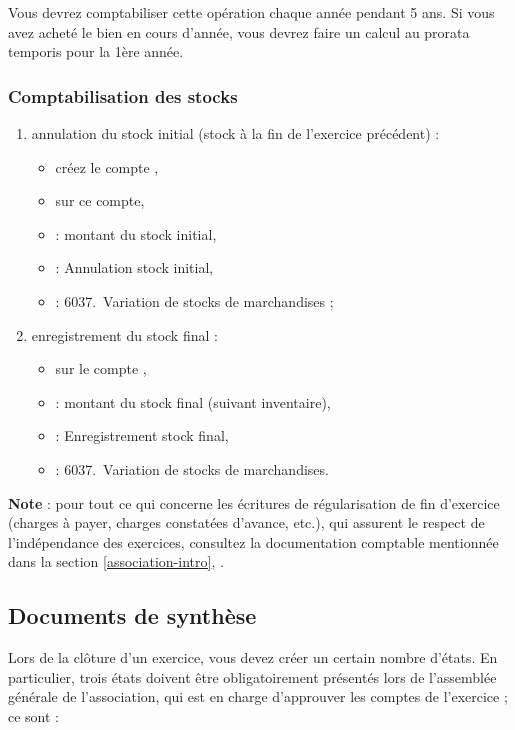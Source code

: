 Vous devrez comptabiliser cette opération chaque année pendant 5 ans. Si vous avez acheté le bien en cours d’année, vous devrez faire un calcul au prorata temporis pour la 1ère année.


\subsubsection {Comptabilisation des stocks}

\begin{enumerate}
	\item annulation du stock initial (stock à la fin de l’exercice précédent) :
		\begin{itemize}
			\item créez le compte ,		
			\item sur ce compte,
			\item {} : montant du stock initial,					
			\item {} : Annulation stock initial,
			\item {} : 6037.~Variation de stocks de marchandises ;
		\end{itemize}
	\item enregistrement du stock final :
		\begin{itemize}
			\item sur le compte ,
			\item {} : montant du stock final (suivant inventaire),					
			\item {} : Enregistrement stock final,
			\item {} : 6037.~Variation de stocks de marchandises.
		\end{itemize}				
\end{enumerate}

\textbf{Note} : pour tout ce qui concerne les écritures de régularisation de fin d'exercice (charges à payer, charges constatées d'avance, etc.), qui assurent le respect de l'indépendance des exercices, consultez la documentation comptable mentionnée dans la section \vref{association-intro}, .


\subsection {Documents de synthèse} \label{association-plan-synthesis}

Lors de la clôture d'un exercice, vous devez créer un certain nombre d'états. En particulier, trois états doivent être obligatoirement présentés lors de l'assemblée générale de l'association, qui est en charge d'approuver les comptes de l'exercice ; ce sont :

